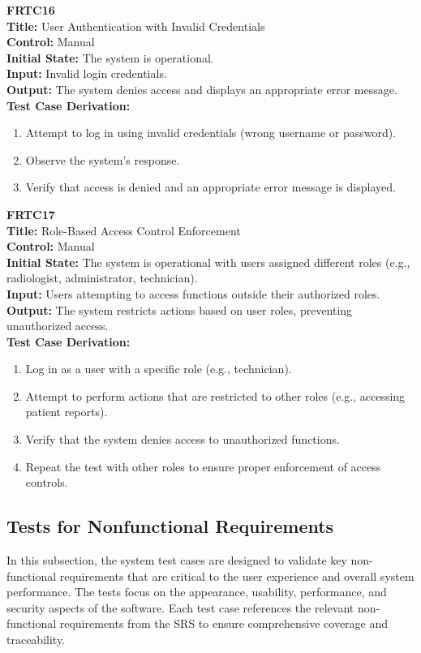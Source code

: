 \documentclass[12pt, titlepage]{article}
\begin{document}
\textbf{FRTC16}\\
\textbf{Title:} User Authentication with Invalid Credentials\\
\textbf{Control:} Manual\\
\textbf{Initial State:} The system is operational.\\
\textbf{Input:} Invalid login credentials.\\
\textbf{Output:} The system denies access and displays an appropriate error message.\\
\textbf{Test Case Derivation:}
\begin{enumerate}
  \item Attempt to log in using invalid credentials (wrong username or password).
  \item Observe the system's response.
  \item Verify that access is denied and an appropriate error message is displayed.
\end{enumerate}
\vspace{1em}

\textbf{FRTC17}\\
\textbf{Title:} Role-Based Access Control Enforcement\\
\textbf{Control:} Manual\\
\textbf{Initial State:} The system is operational with users assigned different roles (e.g., radiologist, administrator, technician).\\
\textbf{Input:} Users attempting to access functions outside their authorized roles.\\
\textbf{Output:} The system restricts actions based on user roles, preventing unauthorized access.\\
\textbf{Test Case Derivation:}
\begin{enumerate}
  \item Log in as a user with a specific role (e.g., technician).
  \item Attempt to perform actions that are restricted to other roles (e.g., accessing patient reports).
  \item Verify that the system denies access to unauthorized functions.
  \item Repeat the test with other roles to ensure proper enforcement of access controls.
\end{enumerate}
\vspace{1em}

\subsection{Tests for Nonfunctional Requirements}
In this subsection, the system test cases are designed to validate key non-functional requirements
that are critical to the user experience and overall system performance. The tests focus on the
appearance, usability, performance, and security aspects of the software. Each test case
references the relevant non-functional requirements from the SRS to ensure comprehensive coverage
and traceability.
\end{document}
